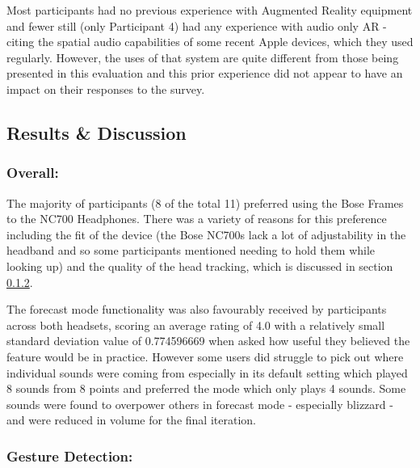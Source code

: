 \documentclass{l4proj}
\begin{document}
Most participants had no previous experience with Augmented Reality equipment and fewer still (only Participant 4) had any experience with audio only AR - citing the spatial audio capabilities of some recent Apple devices, which they used regularly. However, the uses of that system are quite different from those being presented in this evaluation and this prior experience did not appear to have an impact on their responses to the survey.

\subsection{Results \& Discussion}
\subsubsection{Overall: }The majority of participants (8 of the total 11) preferred using the Bose Frames to the NC700 Headphones. There was a variety of reasons for this preference including the fit of the device (the Bose NC700s lack a lot of adjustability in the headband and so some participants mentioned needing to hold them while looking up) and the quality of the head tracking, which is discussed in section \ref{sec:gesture_detection_eval}.

The forecast mode functionality was also favourably received by participants across both headsets, scoring an average rating of \num{4.0} with a relatively small standard deviation value of \num{0.774596669
} when asked how useful they believed the feature would be in practice. However some users did struggle to pick out where individual sounds were coming from especially in its default setting which played 8 sounds from 8 points and preferred the mode which only plays 4 sounds. Some sounds were found to overpower others in forecast mode - especially blizzard - and were reduced in volume for the final iteration.

\subsubsection{Gesture Detection: }\label{sec:gesture_detection_eval}
\end{document}
